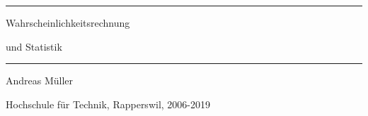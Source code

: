 \documentclass[a4paper,12pt]{book}
\begin{document}
\pagestyle{fancy}
\frontmatter
\newcommand\HRule{\noindent\rule{\linewidth}{1.5pt}}
\begin{titlepage}
\HRule
\vspace*{10pt}
\begin{flushright}
{\Huge
Wahrscheinlichkeitsrechnung}
\end{flushright}
\begin{flushright}
{\Huge und Statistik}
\end{flushright}
\HRule
\begin{flushright}
\vspace{30pt}
\LARGE
Andreas Müller
\end{flushright}
\begin{center}
Hochschule für Technik, Rapperswil, 2006-2019
\end{center}
\end{titlepage}

\newenvironment{beispiele}{
\bgroup\smallskip\parindent0pt\bf Beispiele\egroup

\begin{list}{\arabic{beispiel}.}
  {\usecounter{beispiel}
  \setlength{\labelsep}{5mm}
  \setlength{\rightmargin}{0pt}
}}{\end{list}}
\newenvironment{teilaufgaben}{
\begin{enumerate}
\renewcommand{\labelenumi}{\alph{enumi})}
}{\end{enumerate}}
\newenvironment{beispiel}[1][Beispiel]{%
\begin{proof}[\bf #1]%
\renewcommand{\qedsymbol}{$\bigcirc$}%
}{\end{proof}}
\def\swallow#1{
}
\newenvironment{loesung}{%
\begin{proof}[Lösung]%
\renewcommand{\qedsymbol}{$\bigcirc$}
}{\end{proof}}
\def\keineloesungen{%
\renewenvironment{loesung}{\swallow\begingroup}{\endgroup}%
}

\hypersetup{
    linktoc=all,
    linkcolor=blue
}

\tableofcontents
\newtheorem{satz}{Satz}[chapter]
\newtheorem{hilfssatz}{Hilfssatz}[chapter]
\newtheorem{definition}{Definition}[chapter]
\newtheorem{annahme}{Annahme}[chapter]
\mainmatter
\allowdisplaybreaks










\appendix
%


\clearpage
\pagebreak
\ifodd\value{page}\else\null\clearpage\fi


\end{document}
